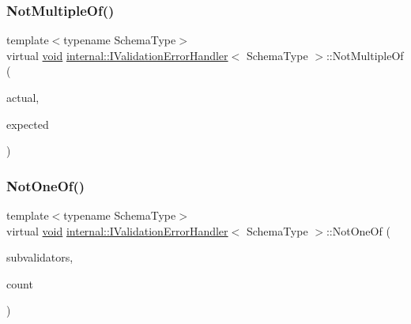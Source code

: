 \mbox{\label{classinternal_1_1IValidationErrorHandler_ada3d2275ccdeb4874f34942d257af9c5}} 
\subsubsection{\texorpdfstring{Not\+Multiple\+Of()}{NotMultipleOf()}\hspace{0.1cm}{\footnotesize\ttfamily [3/3]}}
{\footnotesize\ttfamily template$<$typename Schema\+Type$>$ \\
virtual \hyperlink{imgui__impl__opengl3__loader_8h_ac668e7cffd9e2e9cfee428b9b2f34fa7}{void} \hyperlink{classinternal_1_1IValidationErrorHandler}{internal\+::\+I\+Validation\+Error\+Handler}$<$ Schema\+Type $>$\+::Not\+Multiple\+Of (\begin{DoxyParamCaption}\item[{double}]{actual,  }\item[{const \hyperlink{classinternal_1_1IValidationErrorHandler_a22eda6c4ea9537f1ba00d76af052649a}{S\+Value} \&}]{expected }\end{DoxyParamCaption})\hspace{0.3cm}{\ttfamily [pure virtual]}}

\mbox{\label{classinternal_1_1IValidationErrorHandler_a76cae77f1b841843473f7a61975aa8e6}} 
\subsubsection{\texorpdfstring{Not\+One\+Of()}{NotOneOf()}}
{\footnotesize\ttfamily template$<$typename Schema\+Type$>$ \\
virtual \hyperlink{imgui__impl__opengl3__loader_8h_ac668e7cffd9e2e9cfee428b9b2f34fa7}{void} \hyperlink{classinternal_1_1IValidationErrorHandler}{internal\+::\+I\+Validation\+Error\+Handler}$<$ Schema\+Type $>$\+::Not\+One\+Of (\begin{DoxyParamCaption}\item[{\hyperlink{classinternal_1_1ISchemaValidator}{I\+Schema\+Validator} $\ast$$\ast$}]{subvalidators,  }\item[{\hyperlink{rapidjson_8h_a5ed6e6e67250fadbd041127e6386dcb5}{Size\+Type}}]{count }\end{DoxyParamCaption})\hspace{0.3cm}{\ttfamily [pure virtual]}}

